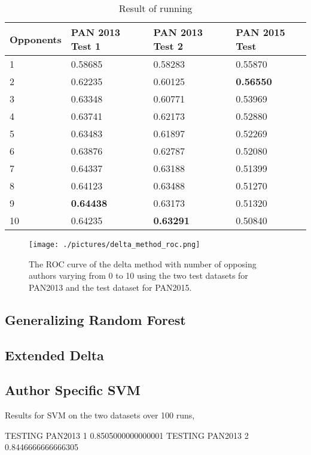 \begin{table}
    \begin{tabular}{l|lll}
        \textbf{Opponents} & \textbf{PAN 2013 Test 1} & \textbf{PAN 2013 Test 2}
        & \textbf{PAN 2015 Test} \\ \hline
        1  & 0.58685 & 0.58283 & 0.55870 \\
        2  & 0.62235 & 0.60125 & \textbf{0.56550} \\
        3  & 0.63348 & 0.60771 & 0.53969 \\
        4  & 0.63741 & 0.62173 & 0.52880 \\
        5  & 0.63483 & 0.61897 & 0.52269 \\
        6  & 0.63876 & 0.62787 & 0.52080 \\
        7  & 0.64337 & 0.63188 & 0.51399 \\
        8  & 0.64123 & 0.63488 & 0.51270 \\
        9  & \textbf{0.64438} & 0.63173 & 0.51320 \\
        10 & 0.64235 & \textbf{0.63291} & 0.50840
    \end{tabular}
    \caption{Result of running}
    \label{tab:delta_method_final_results}
\end{table}

\begin{figure}
    \centering
    \texttt{[image: ./pictures/delta\_method\_roc.png]}
    \caption{The ROC curve of the delta method with number of opposing authors
    varying from 0 to 10 using the two test datasets for PAN2013 and the test
    dataset for PAN2015.}
    \label{fig:delta_method_roc}
\end{figure}

\subsection{Generalizing Random Forest}

\subsection{Extended Delta}

\subsection{Author Specific SVM}

Results for SVM on the two datasets over 100 runs,

TESTING PAN2013 1
0.8505000000000001
TESTING PAN2013 2
0.8446666666666305
